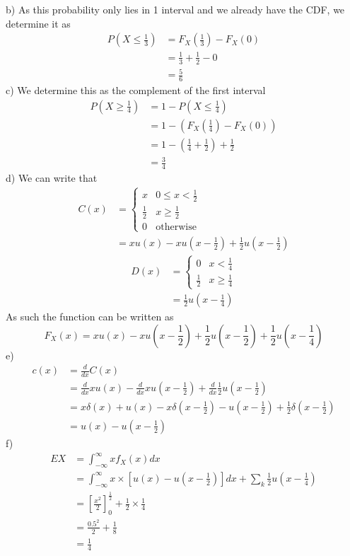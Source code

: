 b)
As this probability only lies in 1 interval and we already have the CDF, we determine it as
\begin{align*}
    P\left(X\leq\frac{1}{3}\right)&=F_{X}\left(\frac{1}{3}\right)-F_{X}(0) \\
          &=\frac{1}{3}+\frac{1}{2}-0 \\
          &=\frac{5}{6}
\end{align*}
c)
We determine this as the complement of the first interval
\begin{align*}
    P\left(X\geq \frac{1}{4}\right)&=1-P\left(X\leq\frac{1}{4}\right) \\
           &=1-\left(F_{X}\left(\frac{1}{4}\right)-F_{X}(0)\right) \\
           &=1-\left(\frac{1}{4}+\frac{1}{2}\right)+\frac{1}{2} \\
           &=\frac{3}{4}
\end{align*}
d)
We can write that
\begin{align*}
    C(x)&=\begin{cases}x & 0\leq x<\frac{1}{2} \\ \frac{1}{2} & x\geq \frac{1}{2} \\ 0 & \text{otherwise}\end{cases} \\
        &=xu(x)-xu\left(x-\frac{1}{2}\right)+\frac{1}{2}u\left(x-\frac{1}{2}\right)
\end{align*}
\begin{align*}
    D(x)&=\begin{cases}0 & x<\frac{1}{4} \\ \frac{1}{2} & x\geq\frac{1}{4}\end{cases} \\
        &=\frac{1}{2}u\left(x-\frac{1}{4}\right)
\end{align*}
As such the function can be written as
\[
    F_{X}(x)=xu(x)-xu\left(x-\frac{1}{2}\right)+\frac{1}{2}u\left(x-\frac{1}{2}\right)+\frac{1}{2}u\left(x-\frac{1}{4}\right)
\]
e)
\begin{align*}
    c(x)&=\frac{d}{dx}C(x) \\
        &=\frac{d}{dx}xu(x)-\frac{d}{dx}xu\left(x-\frac{1}{2}\right)+\frac{d}{dx}\frac{1}{2}u\left(x-\frac{1}{2}\right) \\
        &=x\delta(x)+u(x)-x\delta\left(x-\frac{1}{2}\right)-u\left(x-\frac{1}{2}\right)+\frac{1}{2}\delta\left(x-\frac{1}{2}\right) \\
        &=u(x)-u\left(x-\frac{1}{2}\right)
\end{align*}
f)
\begin{align*}
    EX&=\int_{-\infty}^{\infty}xf_{X}(x)dx \\
      &=\int_{-\infty}^{\infty}x\times\left[u(x)-u\left(x-\frac{1}{2}\right)\right]dx+\sum_{k}\frac{1}{2}u\left(x-\frac{1}{4}\right) \\
      &=\left[\frac{x^{2}}{2}\right]_{0}^{\frac{1}{2}}+\frac{1}{2}\times\frac{1}{4} \\
      &=\frac{0.5^{2}}{2}+\frac{1}{8} \\
      &=\frac{1}{4}
\end{align*}
